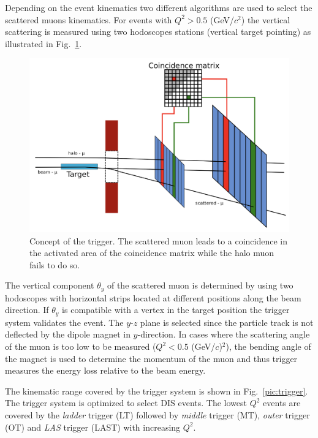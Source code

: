Depending on the event kinematics two different algorithms are used to select the scattered muons kinematics. For events with $Q^2>0.5$ (GeV/$c^2$) the vertical scattering is measured using two hodoscopes stations (vertical target pointing) as illustrated in Fig.~\ref{pic:triglogic}.

\begin{figure}[!h]
  \centering
	\includegraphics[scale=0.5]{./gfx/TriggerLogic.png}
	\caption{Concept of the trigger. The scattered muon leads to a coincidence in the activated area of the coincidence matrix while the halo muon fails to do so.}
	\label{pic:triglogic}
\end{figure}

The vertical component $\theta_y$ of the scattered muon is determined by using two hodoscopes with horizontal strips located at different positions along the beam direction. If $\theta_y$ is compatible with a vertex in the target position the trigger system validates the event. The $y$-$z$ plane is selected since the particle track is not deflected by the dipole magnet in $y$-direction. In cases where the scattering angle of the muon is too low to be measured ($Q^2 < 0.5$ (GeV/$c$)$^2$), the bending angle of the magnet is used to determine the momentum of the muon and thus trigger measures the energy loss relative to the beam energy.

The kinematic range covered by the trigger system is shown in Fig.~\ref{pic:trigger}. The trigger system is optimized to select DIS events. The lowest $Q^2$ events are covered by the \textit{ladder} trigger (LT) followed by \textit{middle} trigger (MT), \textit{outer} trigger (OT) and \textit{LAS} trigger (LAST) with increasing $Q^2$.

